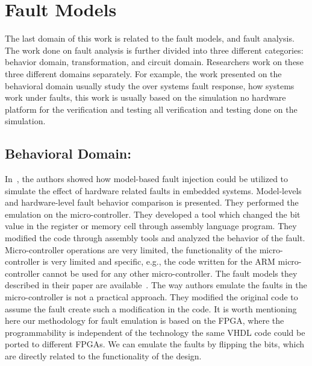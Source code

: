 \section{Fault Models}
The last domain of this work is related to the fault models, and fault analysis. The work done on fault analysis is further divided into three different categories: behavior domain, transformation, and circuit domain. Researchers work on these three different domains separately. For example, the work presented on the behavioral domain usually study the over systems fault response, how systems work under faults, this work is usually based on the simulation no hardware platform for the verification and testing all verification and testing done on the simulation.

\subsection{Behavioral Domain:}
\label{faultmodels}
In~\citep{svenningsson2010model}, the authors showed how model-based fault injection could be utilized to
simulate the effect of hardware related faults in embedded systems. Model-levels and hardware-level
fault behavior comparison is presented. They performed the emulation on the micro-controller. They developed a tool which changed the bit value in the register or memory cell through assembly language program. They modified the code through assembly tools and analyzed the behavior of the fault. Micro-controller operations are very limited, the functionality of the micro-controller is very limited and specific, e.g., the code written for the ARM micro-controller cannot be used for any other micro-controller. The fault models they described in their paper are available~\citep{Mogentes}. The way authors emulate the faults in the micro-controller is not a practical approach. They modified the  original code to assume the fault create such a modification in the code. It is worth mentioning here our methodology for fault emulation is based on the FPGA, where the programmability is independent of the technology the same VHDL code could be ported to different FPGAs. We can emulate the faults by flipping the bits, which are directly related to the functionality of the design.

